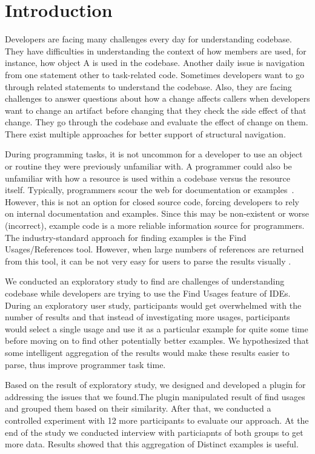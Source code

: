 \documentclass[conference]{IEEEtran}
\begin{document}
\section{Introduction}
Developers are facing many challenges every day for understanding codebase. They have difficulties in understanding the context of how members are used, for instance, how object A is used in the codebase. Another daily issue is navigation from one statement other to task-related code. Sometimes developers want to go through related statements to understand the codebase. Also, they are facing challenges to answer questions about how a change affects callers when developers want to change an artifact before changing that they check the side effect of that change. They go through the codebase and evaluate the effect of change on them. There exist multiple approaches for better support of structural navigation.\par
During programming tasks, it is not uncommon for a developer to use an object or routine they were previously unfamiliar with. A programmer could also be unfamiliar with how a resource is used within a codebase versus the resource itself. Typically, programmers scour the web for documentation or examples~\cite{brandt2009two}. However, this is not an option for closed source code, forcing developers to rely on internal documentation and examples. Since this may be non-existent or worse (incorrect), example code is a more reliable information source for programmers. The industry-standard approach for finding examples is the Find Usages/References tool. However, when large numbers of references are returned from this tool, it can be not very easy for users to parse the results visually .\par
We conducted an exploratory study to find are challenges of understanding codebase while developers are trying to use the Find Usages feature of IDEs. During an exploratory user study, participants would get overwhelmed with the number of results and that instead of investigating more usages, participants would select a single usage and use it as a particular example for quite some time before moving on to find other potentially better examples.
We hypothesized that some intelligent aggregation of the results would make these results easier to parse, thus improve programmer task time.\par
Based on the result of exploratory study, we designed and developed a plugin for addressing the issues that we found.The plugin manipulated  result  of  find  usages and  grouped  them  based  on  their  similarity.  After  that,  we conducted  a  controlled  experiment  with  12  more  participants to  evaluate  our  approach. At the end of the study we conducted interview with particiapnts of both groups to get more data. Results  showed  that  this  aggregation of  Distinct  examples  is  useful.\par
\end{document}
